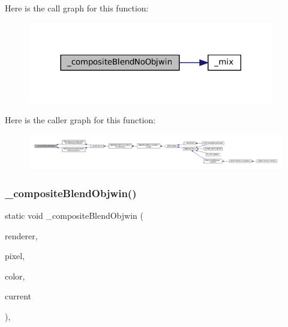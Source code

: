 Here is the call graph for this function\+:
\nopagebreak
\begin{figure}[H]
\begin{center}
\leavevmode
\includegraphics[width=305pt]{software-private_8h_a7f6ac8624c7426eac5b84e727fd81ea6_cgraph}
\end{center}
\end{figure}
Here is the caller graph for this function\+:
\nopagebreak
\begin{figure}[H]
\begin{center}
\leavevmode
\includegraphics[width=350pt]{software-private_8h_a7f6ac8624c7426eac5b84e727fd81ea6_icgraph}
\end{center}
\end{figure}
\mbox{\label{software-private_8h_a194890ebd968b26526048988c98e3f7a}} 
\subsubsection{\texorpdfstring{\+\_\+composite\+Blend\+Objwin()}{\_compositeBlendObjwin()}}
{\footnotesize\ttfamily static void \+\_\+composite\+Blend\+Objwin (\begin{DoxyParamCaption}\item[{struct G\+B\+A\+Video\+Software\+Renderer $\ast$}]{renderer,  }\item[{uint32\+\_\+t $\ast$}]{pixel,  }\item[{uint32\+\_\+t}]{color,  }\item[{uint32\+\_\+t}]{current }\end{DoxyParamCaption})\hspace{0.3cm}{\ttfamily [inline]}, {\ttfamily [static]}}

